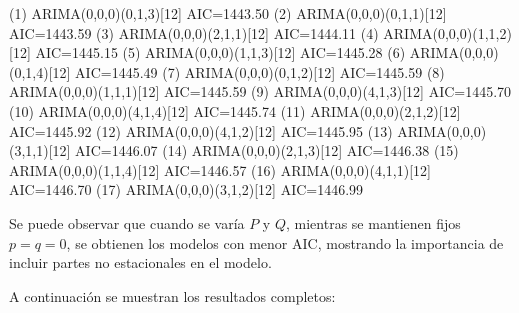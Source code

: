 \documentclass[12pt,letterpaper]{article}   %
\begin{document}
\begin{smallconsole}[caption={Modelos Ordenados por AIC donde $P = 0, 1, 2, \dots$ y $Q = 0, 1, 2, \dots$.}]
(1)   ARIMA(0,0,0)(0,1,3)[12]     AIC=1443.50  
(2)   ARIMA(0,0,0)(0,1,1)[12]     AIC=1443.59  
(3)   ARIMA(0,0,0)(2,1,1)[12]     AIC=1444.11  
(4)   ARIMA(0,0,0)(1,1,2)[12]     AIC=1445.15  
(5)   ARIMA(0,0,0)(1,1,3)[12]     AIC=1445.28  
(6)   ARIMA(0,0,0)(0,1,4)[12]     AIC=1445.49  
(7)   ARIMA(0,0,0)(0,1,2)[12]     AIC=1445.59  
(8)   ARIMA(0,0,0)(1,1,1)[12]     AIC=1445.59  
(9)   ARIMA(0,0,0)(4,1,3)[12]     AIC=1445.70  
(10)  ARIMA(0,0,0)(4,1,4)[12]     AIC=1445.74  
(11)  ARIMA(0,0,0)(2,1,2)[12]     AIC=1445.92  
(12)  ARIMA(0,0,0)(4,1,2)[12]     AIC=1445.95  
(13)  ARIMA(0,0,0)(3,1,1)[12]     AIC=1446.07  
(14)  ARIMA(0,0,0)(2,1,3)[12]     AIC=1446.38  
(15)  ARIMA(0,0,0)(1,1,4)[12]     AIC=1446.57  
(16)  ARIMA(0,0,0)(4,1,1)[12]     AIC=1446.70  
(17)  ARIMA(0,0,0)(3,1,2)[12]     AIC=1446.99  
\end{smallconsole}

Se puede observar que cuando se varía $P$ y $Q$, mientras se mantienen fijos $p=q=0$, se obtienen los modelos con menor AIC, mostrando la importancia de incluir partes no estacionales en el modelo.

\newpage

A continuación se muestran los resultados completos: 
\end{document}
